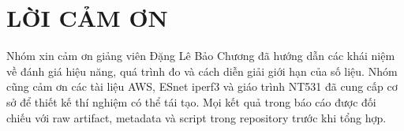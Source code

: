 \chapter*{LỜI CẢM ƠN}

Nhóm xin cảm ơn giảng viên Đặng Lê Bảo Chương đã hướng dẫn các khái niệm về
đánh giá hiệu năng, quá trình đo và cách diễn giải giới hạn của số liệu. Nhóm
cũng cảm ơn các tài liệu AWS, ESnet iperf3 và giáo trình NT531 đã cung cấp cơ sở
để thiết kế thí nghiệm có thể tái tạo. Mọi kết quả trong báo cáo được đối chiếu
với raw artifact, metadata và script trong repository trước khi tổng hợp.
